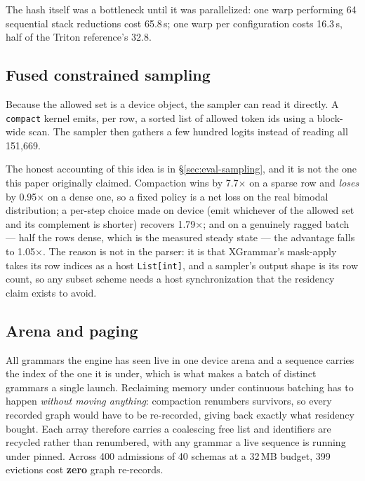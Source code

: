 \documentclass{article}
\begin{document}
The hash itself was a bottleneck until it was parallelized: one warp performing
64 sequential stack reductions cost 65.8\,\textmu{}s; one warp per configuration
costs 16.3\,\textmu{}s, half of the Triton reference's 32.8.

\subsection{Fused constrained sampling}
\label{sec:sampling}

Because the allowed set is a device object, the sampler can read it directly.
A \texttt{compact} kernel emits, per row, a sorted list of allowed token ids
using a block-wide scan. The sampler then gathers a few hundred logits instead
of reading all 151{,}669.

The honest accounting of this idea is in \S\ref{sec:eval-sampling}, and it is
not the one this paper originally claimed. Compaction wins by 7.7$\times$ on a
sparse row and \emph{loses} by 0.95$\times$ on a dense one, so a fixed policy is
a net loss on the real bimodal distribution; a per-step choice made on device
(emit whichever of the allowed set and its complement is shorter) recovers
1.79$\times$; and on a genuinely ragged batch --- half the rows dense, which is
the measured steady state --- the advantage falls to 1.05$\times$. The reason is
not in the parser: it is that XGrammar's mask-apply takes its row indices as a
host \texttt{List[int]}, and a sampler's output shape is its row count, so any
subset scheme needs a host synchronization that the residency claim exists to
avoid.

\subsection{Arena and paging}

All grammars the engine has seen live in one device arena and a sequence
carries the index of the one it is under, which is what makes a batch of
distinct grammars a single launch. Reclaiming memory under continuous batching
has to happen \emph{without moving anything}: compaction renumbers survivors,
so every recorded graph would have to be re-recorded, giving back exactly what
residency bought. Each array therefore carries a coalescing free list and
identifiers are recycled rather than renumbered, with any grammar a live
sequence is running under pinned. Across 400 admissions of 40 schemas at a
32\,MB budget, 399 evictions cost \textbf{zero} graph re-records.
\end{document}
